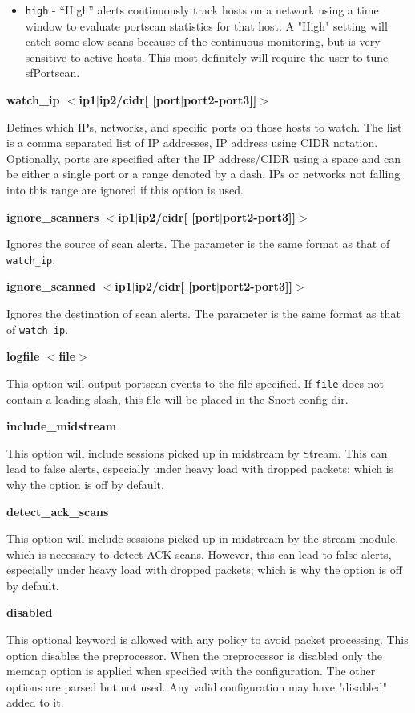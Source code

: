 \documentclass[english]{report}
\newcounter{slistnum}
\newenvironment{slist}
{ \begin{list}{ {\bf \arabic{slistnum}.} }{\usecounter{slistnum} } }
{ \end{list} }
\begin{document}
\begin{slist}
\begin{itemize}
\item \texttt{high} - ``High'' alerts continuously track hosts on a network
using a time window to evaluate portscan statistics for that host. A "High"
setting will catch some slow scans because of the continuous monitoring, but is
very sensitive to active hosts. This most definitely will require the user to
tune sfPortscan.

\end{itemize}

\item \textbf{watch\_ip $<$ip1$|$ip2/cidr[ [port$|$port2-port3]]$>$ }

Defines which IPs, networks, and specific ports on those hosts to watch.  The
list is a comma separated list of IP addresses, IP address using CIDR notation.
Optionally, ports are specified after the IP address/CIDR using a space and can
be either a single port or a range denoted by a dash.  IPs or networks not
falling into this range are ignored if this option is used.

\item \textbf{ignore\_scanners $<$ip1$|$ip2/cidr[ [port$|$port2-port3]]$>$ }

Ignores the source of scan alerts.  The parameter is the same format as that of
\texttt{watch\_ip}.

\item \textbf{ignore\_scanned $<$ip1$|$ip2/cidr[ [port$|$port2-port3]]$>$ }

Ignores the destination of scan alerts.  The parameter is the same format as
that of \texttt{watch\_ip}.

\item \textbf{logfile $<$file$>$ } 

This option will output portscan events to the file specified. If \texttt{file}
does not contain a leading slash, this file will be placed in the Snort config
dir.

\item \textbf{include\_midstream}

This option will include sessions picked up in midstream by Stream.
This can lead to false alerts, especially under heavy load with dropped
packets; which is why the option is off by default.

\item \textbf{detect\_ack\_scans}

This option will include sessions picked up in midstream by the stream module,
which is necessary to detect ACK scans.  However, this can lead to false
alerts, especially under heavy load with dropped packets; which is why the
option is off by default.

\item \textbf{disabled}

This optional keyword is allowed with any policy to avoid packet processing.
This option disables the preprocessor. When the preprocessor is disabled
only the memcap option is applied when specified with the configuration.
The other options are parsed but not used. Any valid configuration may have
"disabled" added to it.

\end{slist}
\end{document}

